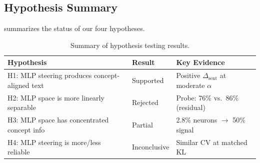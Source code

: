 \subsection{Hypothesis Summary}
\label{sec:hypotheses}

 summarizes the status of our four hypotheses.

\begin{table}[t]
\centering
\caption{Summary of hypothesis testing results.}
\label{tab:hypotheses}
\begin{tabular}{@{}lll@{}}
\toprule
Hypothesis & Result & Key Evidence \\
\midrule
H1: MLP steering produces concept-aligned text & Supported & Positive $\Delta_{\text{sent}}$ at moderate $\alpha$ \\
H2: MLP space is more linearly separable & Rejected & Probe: 76\% vs.\ 86\% (residual) \\
H3: MLP space has concentrated concept info & Partial & 2.8\% neurons $\rightarrow$ 50\% signal \\
H4: MLP steering is more/less reliable & Inconclusive & Similar CV at matched KL \\
\bottomrule
\end{tabular}
\end{table}
